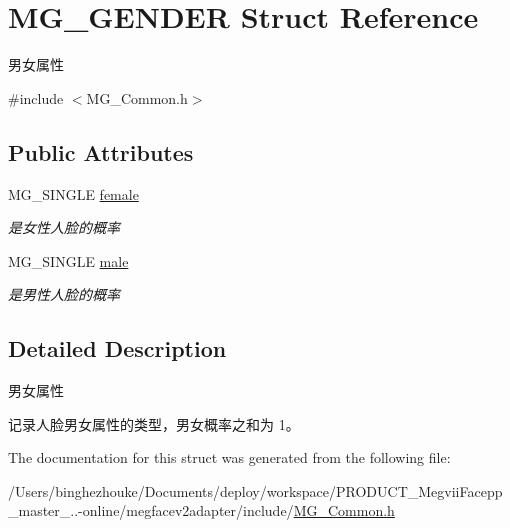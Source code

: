 \hypertarget{struct_m_g___g_e_n_d_e_r}{}\section{M\+G\+\_\+\+G\+E\+N\+D\+ER Struct Reference}
\label{struct_m_g___g_e_n_d_e_r}


男女属性  




{\ttfamily \#include $<$M\+G\+\_\+\+Common.\+h$>$}

\subsection*{Public Attributes}
\begin{DoxyCompactItemize}
\item 
\mbox{\label{struct_m_g___g_e_n_d_e_r_af2af039fb84764abb99ff7d2cd31af05}} 
M\+G\+\_\+\+S\+I\+N\+G\+LE \hyperlink{struct_m_g___g_e_n_d_e_r_af2af039fb84764abb99ff7d2cd31af05}{female}
\begin{DoxyCompactList}\small\item\em 是女性人脸的概率 \end{DoxyCompactList}\item 
\mbox{\label{struct_m_g___g_e_n_d_e_r_a5e590abc870bd200985d5f635f9b8187}} 
M\+G\+\_\+\+S\+I\+N\+G\+LE \hyperlink{struct_m_g___g_e_n_d_e_r_a5e590abc870bd200985d5f635f9b8187}{male}
\begin{DoxyCompactList}\small\item\em 是男性人脸的概率 \end{DoxyCompactList}\end{DoxyCompactItemize}


\subsection{Detailed Description}
男女属性 

记录人脸男女属性的类型，男女概率之和为 1。 

The documentation for this struct was generated from the following file\+:\begin{DoxyCompactItemize}
\item 
/\+Users/binghezhouke/\+Documents/deploy/workspace/\+P\+R\+O\+D\+U\+C\+T\+\_\+\+Megvii\+Facepp\+\_\+master\+\_..-\/online/megfacev2adapter/include/\hyperlink{_m_g___common_8h}{M\+G\+\_\+\+Common.\+h}\end{DoxyCompactItemize}
